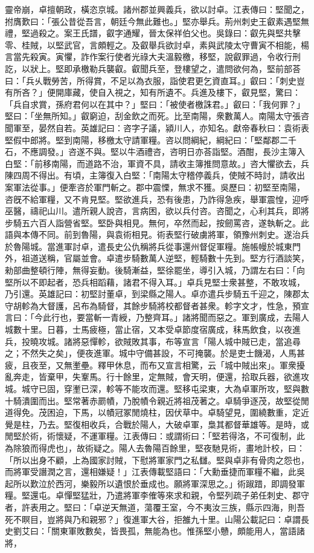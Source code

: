 \begin{pinyinscope}
靈帝崩，卓擅朝政，橫恣京城。諸州郡並興義兵，欲以討卓。江表傳曰：堅聞之，拊膺歎曰：「張公昔從吾言，朝廷今無此難也。」堅亦舉兵。荊州刺史王叡素遇堅無禮，堅過殺之。案王氏譜，叡字通耀，晉太保祥伯父也。吳錄曰：叡先與堅共擊零、桂賊，以堅武官，言頗輕之。及叡舉兵欲討卓，素與武陵太守曹寅不相能，楊言當先殺寅。寅懼，詐作案行使者光祿大夫溫毅檄，移堅，說叡罪過，令收行刑訖，以狀上。堅即承檄勒兵襲叡。叡聞兵至，登樓望之，遣問欲何為，堅前部荅曰：「兵乆戰勞苦，所得賞，不足以為衣服，詣使君更乞資直耳。」叡曰：「刺史豈有所吝？」便開庫藏，使自入視之，知有所遺不。兵進及樓下，叡見堅，驚曰：「兵自求賞，孫府君何以在其中？」堅曰：「被使者檄誅君。」叡曰：「我何罪？」堅曰：「坐無所知。」叡窮迫，刮金飲之而死。比至南陽，衆數萬人。南陽太守張咨聞軍至，晏然自若。英雄記曰：咨字子議，潁川人，亦知名。獻帝春秋曰：袁術表堅假中郎將。堅到南陽，移檄太守請軍糧。咨以問綱紀，綱紀曰：「堅鄰郡二千石，不應調發。」咨遂不與。堅以牛酒禮咨，咨明日亦荅詣堅。酒酣，長沙主簿入白堅：「前移南陽，而道路不治，軍資不具，請收主簿推問意故。」咨大懼欲去，兵陳四周不得出。有頃，主簿復入白堅：「南陽太守稽停義兵，使賊不時討，請收出案軍法從事。」便牽咨於軍門斬之。郡中震慄，無求不獲。吳歷曰：初堅至南陽，咨旣不給軍糧，又不肯見堅。堅欲進兵，恐有後患，乃詐得急疾，舉軍震惶，迎呼巫醫，禱祀山川。遣所親人說咨，言病困，欲以兵付咨。咨聞之，心利其兵，即將步騎五六百人詣營省堅。堅卧與相見。無何，卒然而起，按劒罵咨，遂執斬之。此語與本傳不同。前到魯陽，與袁術相見。術表堅行破虜將軍，領豫州刺史。遂治兵於魯陽城。當進軍討卓，遣長史公仇稱將兵從事還州督促軍糧。施帳幔於城東門外，祖道送稱，官屬並會。卓遣步騎數萬人逆堅，輕騎數十先到。堅方行酒談笑，勑部曲整頓行陣，無得妄動。後騎漸益，堅徐罷坐，導引入城，乃謂左右曰：「向堅所以不即起者，恐兵相蹈藉，諸君不得入耳。」卓兵見堅士衆甚整，不敢攻城，乃引還。英雄記曰：初堅討董卓，到梁縣之陽人。卓亦遣兵步騎五千迎之，陳郡太守胡軫為大督護，呂布為騎督，其餘步騎將校都督者甚衆。軫字文才，性急，預宣言曰：「今此行也，要當斬一青綬，乃整齊耳。」諸將聞而惡之。軍到廣成，去陽人城數十里。日暮，士馬疲極，當止宿，又本受卓節度宿廣成，秣馬飲食，以夜進兵，投曉攻城。諸將惡憚軫，欲賊敗其事，布等宣言「陽人城中賊已走，當追尋之；不然失之矣」，便夜進軍。城中守備甚設，不可掩襲。於是吏士饑渴，人馬甚疲，且夜至，又無壍壘。釋甲休息，而布又宣言相驚，云「城中賊出來」。軍衆擾亂奔走，皆棄甲，失鞌馬。行十餘里，定無賊，會天明，便還，拾取兵器，欲進攻城。城守已固，穿壍已深，軫等不能攻而還。堅移屯梁東，大為卓軍所攻，堅與數十騎潰圍而出。堅常著赤罽幘，乃脫幘令親近將祖茂著之。卓騎爭逐茂，故堅從閒道得免。茂困迫，下馬，以幘冠冢閒燒柱，因伏草中。卓騎望見，圍繞數重，定近覺是柱，乃去。堅復相收兵，合戰於陽人，大破卓軍，梟其都督華雄等。是時，或閒堅於術，術懷疑，不運軍糧。江表傳曰：或謂術曰：「堅若得洛，不可復制，此為除狼而得虎也」，故術疑之。陽人去魯陽百餘里，堅夜馳見術，畫地計校，曰：「所以出身不顧，上為國家討賊，下慰將軍家門之私讎。堅與卓非有骨肉之怨也，而將軍受譖潤之言，還相嫌疑！」江表傳載堅語曰：「大勳垂捷而軍糧不繼，此吳起所以歎泣於西河，樂毅所以遺恨於垂成也。願將軍深思之。」術踧踖，即調發軍糧。堅還屯。卓憚堅猛壯，乃遣將軍李傕等來求和親，令堅列疏子弟任刺史、郡守者，許表用之。堅曰：「卓逆天無道，蕩覆王室，今不夷汝三族，縣示四海，則吾死不瞑目，豈將與乃和親邪？」復進軍大谷，拒雒九十里。山陽公載記曰：卓謂長史劉艾曰：「關東軍敗數矣，皆畏孤，無能為也。惟孫堅小戇，頗能用人，當語諸將，
\end{pinyinscope}
